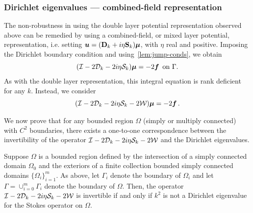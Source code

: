 \subsubsection{Dirichlet eigenvalues --- combined-field representation}
\label{subsec:mixedanalysis}

The non-robustness in using the double layer
potential representation observed above can be
remedied by using a combined-field, or mixed layer potential,
representation, i.e. setting ${\boldsymbol u} = ({\bf D}_{k} + i\eta {\bf S}_{k})
{\boldsymbol \mu}$, with $\eta$ real and positive.
Imposing the Dirichlet boundary condition
and using~\cref{lem:jump-conds}, we obtain 
\begin{equation}
  (\mathcal I - 2{\mathcal D}_{k} - 2i\eta {\mathcal S}_{k}) {\boldsymbol \mu} = -2 {\boldsymbol f} \,
  \textrm{ on } \Gamma. 
\end{equation}
As with the double layer representation, this
integral equation is rank deficient for any $k$.
Instead, we consider
\begin{equation}
(\mathcal I - 2{\mathcal D}_{k} -2i\eta {\mathcal S}_{k}  -2{\mathcal W}){\boldsymbol \mu} = -2 {\boldsymbol f} \, .
\end{equation}

We now prove that for any bounded region $\Omega$
(simply or multiply connected) with $C^{2}$ boundaries,
there exists a one-to-one correspondence between the
invertibility of the operator $\mathcal I - 2{\mathcal D}_{k}
- 2i\eta {\mathcal S}_{k} - 2{\mathcal W}$ and the Dirichlet eigenvalues.

\begin{thrm}
  \label{thm:cfmain}
  Suppose $\Omega$ is a bounded region defined
  by the intersection of a simply connected domain $\Omega_{0}$
  and the exteriors of a finite collection bounded simply
  connected domains $\{ \Omega_{i} \}_{i=1}^{m}$. As above,
  let $\Gamma_{i}$ denote the boundary of $\Omega_{i}$ and let
  $\Gamma = \cup_{i=0}^{m} \Gamma_{i}$ denote the boundary of
  $\Omega$. Then, the operator $\mathcal I - 2{\mathcal D}_{k} - 2i\eta {\mathcal S}_{k}
  - 2{\mathcal W}$ is invertible if and only if $k^2$ is not a Dirichlet
  eigenvalue for the Stokes operator on $\Omega$.
\end{thrm}

